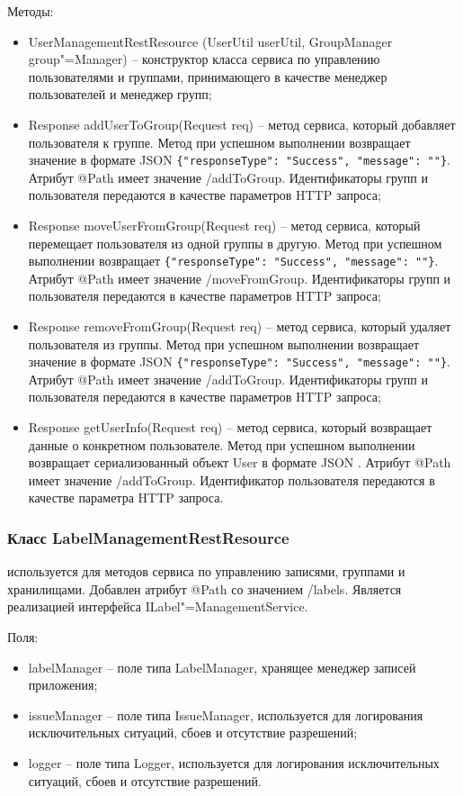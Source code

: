 Методы:
\begin{itemize}
  \item UserManagementRestResource (UserUtil userUtil, GroupManager group"=Manager) – конструктор класса сервиса по управлению пользователями и группами, принимающего в качестве менеджер пользователей и менеджер групп;
  \item Response addUserToGroup(Request req) – метод сервиса, который добавляет пользователя к группе. Метод при успешном выполнении возвращает значение в формате JSON \lstinline!{"responseType": "Success", "message": ""}!.\\ Атрибут @Path имеет значение /addToGroup. Идентификаторы групп и пользователя передаются в качестве параметров HTTP запроса;
  \item Response moveUserFromGroup(Request req) – метод сервиса, который перемещает пользователя из одной группы в другую. Метод при успешном выполнении возвращает \lstinline!{"responseType": "Success", "message": ""}!. Атрибут @Path имеет значение /moveFromGroup. Идентификаторы групп и пользователя передаются в качестве параметров HTTP запроса;
  \item Response removeFromGroup(Request req) – метод сервиса, который удаляет пользователя из группы. Метод при успешном выполнении возвращает значение в формате JSON \lstinline!{"responseType": "Success", "message": ""}!. Атрибут @Path имеет значение /addToGroup. Идентификаторы групп и пользователя передаются в качестве параметров HTTP запроса;
  \item Response getUserInfo(Request req) – метод сервиса, который возвращает данные о конкретном пользователе. Метод при успешном выполнении возвращает сериализованный объект User в формате JSON . Атрибут @Path имеет значение /addToGroup. Идентификатор пользователя передаются в качестве параметра HTTP запроса.
\end{itemize}

\subsubsection{Класс LabelManagementRestResource }
\label{sub:arch_and_mod:application_server_layer:label_management_rest_resource}

используется для методов сервиса по управлению записями, группами и хранилищами. Добавлен атрибут @Path со значением /labels. Является реализацией интерфейса ILabel"=ManagementService.

Поля:
\begin{itemize}
  \item labelManager – поле типа LabelManager, хранящее менеджер записей приложения;
  \item issueManager – поле типа IssueManager, используется для логирования исключительных ситуаций, сбоев и отсутствие разрешений;
  \item logger – поле типа Logger, используется для логирования исключительных ситуаций, сбоев и отсутствие разрешений.
\end{itemize}

